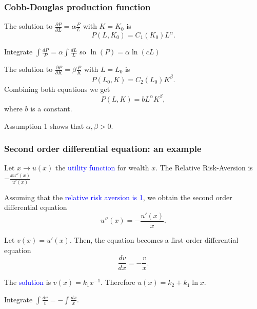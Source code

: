 \documentclass[11pt,aspectratio=169]{beamer}
\begin{document}
\begin{frame}
\frametitle{
 Cobb-Douglas production function}
\begin{small}
The solution to $
\frac{\partial P}{\partial L}=\alpha \frac{P}{L}
$ with $K=K_0$ is
$$P(L, K_0)=C_1(K_0) L^{\alpha}.$$
\begin{tiny}Integrate $\int \frac{dP}{P}=\alpha \int \frac{dL}{L}$
so $\ln(P)=\alpha \ln(cL)$ \end{tiny}
\vskip 12pt
The solution to
$
\frac{\partial P}{\partial K}=\beta \frac{P}{K}
$
with $L=L_0$ is $$P(L_0, K)=C_2(L_0) K^{\beta}.$$
\vskip 10pt
 Combining both equations we get  $$P(L, K)=b L^{\alpha} K^{\beta},$$ where  $b$ is a constant.

\vskip 12pt
 Assumption 1 shows that  $\alpha, \beta>0$.


\end{small}
\end{frame}




\begin{frame}
\frametitle{ Second  order differential equation: an example}
\begin{small}
 Let $x \rightarrow u(x)$ the \textcolor{blue}{utility function} for  wealth $x$. 
\vskip 10pt
The Relative Risk-Aversion is $-\frac{x u''(x)}{u'(x)}$

\vskip 10pt

Assuming that the  \textcolor{blue}{relative risk aversion is 1}, we obtain the second order differential equation
$$
u''(x)=-\frac{u'(x)}{x}.
$$


Let $v(x)=u'(x)$.  Then, the equation becomes a first order differential equation
$$
\frac{dv}{dx}=-\frac{v}{x}.
$$

\vskip 10pt
The \textcolor{blue}{solution} is  $v(x)=k_1 x^{-1}$. Therefore $u(x)=k_2+k_1 \ln  x$.

\begin{tiny}
Integrate $\int \frac{dv}{v}=-\int \frac{dx}{x}$.
\end{tiny}


\end{small}
\end{frame}
\end{document}
